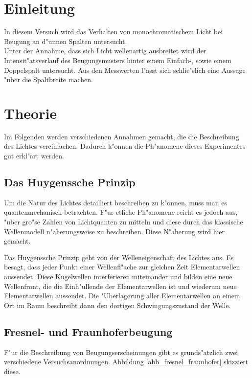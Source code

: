 \section{Einleitung}
	\label{sec:einleitung}
	In diesem Versuch wird das Verhalten von monochromatischem Licht bei Beugung an d"unnen Spalten untersucht.\\
	Unter der Annahme, dass sich Licht wellenartig ausbreitet wird der Intensit"atsverlauf des Beugungsmusters hinter einem Einfach-, sowie einem Doppelspalt untersucht.
	Aus den Messwerten l"asst sich schlie"slich eine Aussage "uber die Spaltbreite machen.

\section{Theorie}
	\label{sec:theorie}

	Im Folgenden werden verschiedenen Annahmen gemacht, die die Beschreibung des Lichtes vereinfachen.
	Dadurch k"onnen die Ph"anomene dieses Experimentes gut erkl"art werden.

	\subsection{Das Huygenssche Prinzip}

		Um die Natur des Lichtes detailliert beschreiben zu k"onnen, muss man es quan\-ten\-me\-cha\-nisch betrachten.
		F"ur etliche Ph"anomene reicht es jedoch aus, "uber gro"se Zahlen von Lichtquanten zu mitteln und diese durch das klassische Wellenmodell n"aherungsweise zu beschreiben.
		Diese N"aherung wird hier gemacht.

		Das Huygenssche Prinzip geht von der Welleneigenschaft des Lichtes aus.
		Es besagt, dass jeder Punkt einer Wellenfl"ache zur gleichen Zeit Elementarwellen aussendet.
		Diese Kugelwellen interferieren miteinander und bilden eine neue Wellenfront,
		die die Ein\-h"ul\-len\-de der Elementarwellen ist und wiederum neue Elementarwellen aussendet.
		Die "Uberlagerung aller Elementarwellen an einem Ort im Raum beschreibt dann den dortigen Schwingungszustand der Welle.

	\subsection{Fresnel- und Fraunhoferbeugung}
		\label{subsec:beugung}

		F"ur die Beschreibung von Beugungserscheinungen gibt es grunds"atzlich zwei verschiedene Versuchsanordnungen. Abbildung \ref{abb_fresnel_fraunhofer} skizziert diese.


